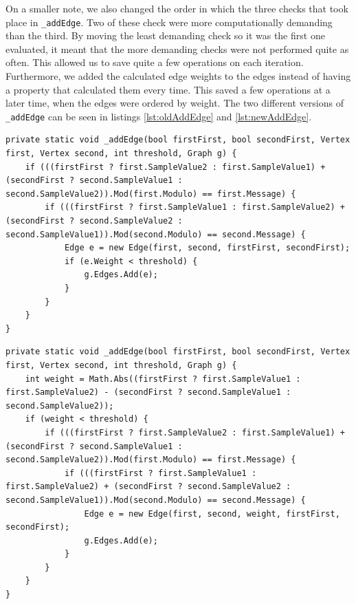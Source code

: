 On a smaller note, we also changed the order in which the three checks that took place in \lstinline|_addEdge|.
Two of these check were more computationally demanding than the third.
By moving the least demanding check so it was the first one evaluated, it meant that the more demanding checks were not performed quite as often.
This allowed us to save quite a few operations on each iteration.
Furthermore, we added the calculated edge weights to the edges instead of having a property that calculated them every time.
This saved a few operations at a later time, when the edges were ordered by weight.
The two different versions of \lstinline|_addEdge| can be seen in listings \ref{lst:oldAddEdge} and \ref{lst:newAddEdge}.

\begin{lstlisting}[firstnumber=478,label=lst:oldAddEdge, caption={The original \lstinline|_addEdge| method. \textbf{File:} first\textunderscore  round/JPEGImage.cs.}]
private static void _addEdge(bool firstFirst, bool secondFirst, Vertex first, Vertex second, int threshold, Graph g) {
    if (((firstFirst ? first.SampleValue2 : first.SampleValue1) + (secondFirst ? second.SampleValue1 : second.SampleValue2)).Mod(first.Modulo) == first.Message) {
        if (((firstFirst ? first.SampleValue1 : first.SampleValue2) + (secondFirst ? second.SampleValue2 : second.SampleValue1)).Mod(second.Modulo) == second.Message) {
            Edge e = new Edge(first, second, firstFirst, secondFirst);
            if (e.Weight < threshold) {
                g.Edges.Add(e);
            }
        }
    }
}
\end{lstlisting}

\begin{lstlisting}[firstnumber=482,label=lst:newAddEdge, caption={The improved \lstinline|_addEdge| method. \textbf{File:} second\textunderscore  round/JPEGImage.cs.}]
private static void _addEdge(bool firstFirst, bool secondFirst, Vertex first, Vertex second, int threshold, Graph g) {
    int weight = Math.Abs((firstFirst ? first.SampleValue1 : first.SampleValue2) - (secondFirst ? second.SampleValue1 : second.SampleValue2));
    if (weight < threshold) {
        if (((firstFirst ? first.SampleValue2 : first.SampleValue1) + (secondFirst ? second.SampleValue1 : second.SampleValue2)).Mod(first.Modulo) == first.Message) {
            if (((firstFirst ? first.SampleValue1 : first.SampleValue2) + (secondFirst ? second.SampleValue2 : second.SampleValue1)).Mod(second.Modulo) == second.Message) {
                Edge e = new Edge(first, second, weight, firstFirst, secondFirst);
                g.Edges.Add(e);
            }
        }
    }
}
\end{lstlisting}

